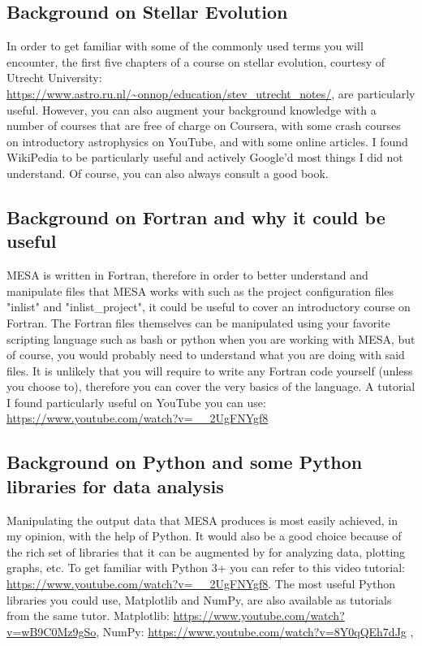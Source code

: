 \documentclass[12pt,hidelinks]{article}
\begin{document}
	\subsection{Background on Stellar Evolution}
			In order to get familiar with some of the commonly used terms you will encounter, the first five chapters of a course on stellar evolution, courtesy of Utrecht University: \url{https://www.astro.ru.nl/~onnop/education/stev_utrecht_notes/}, are particularly useful. However, you can also augment your background knowledge with a number of courses that are free of charge on Coursera, with some crash courses on introductory astrophysics on YouTube, and with some online articles. I found WikiPedia to be particularly useful and actively Google'd most things I did not understand. Of course, you can also always consult a good book.
	\subsection{Background on Fortran and why it could be useful}
			MESA is written in Fortran, therefore in order to better understand and manipulate files that MESA works with such as the project configuration files "inlist" and "inlist\_project", it could be useful to cover an introductory course on Fortran. The Fortran files themselves can be manipulated using your favorite scripting language such as bash or python when you are working with MESA, but of course, you would probably need to understand what you are doing with said files. It is unlikely that you will require to write any Fortran code yourself (unless you choose to), therefore you can cover the very basics of the language. A tutorial I found particularly useful on YouTube you can use: \url{https://www.youtube.com/watch?v=__2UgFNYgf8} 
	\subsection{Background on Python and some Python libraries for data analysis}
			Manipulating the output data that MESA produces is most easily achieved, in my opinion, with the help of Python. It would also be a good choice because of the rich set of libraries that it can be augmented by for analyzing data, plotting graphs, etc. To get familiar with Python 3+ you can refer to this video tutorial: \url{https://www.youtube.com/watch?v=__2UgFNYgf8}. The most useful Python libraries you could use, Matplotlib and NumPy, are also available as tutorials from the same tutor. Matplotlib: \url{https://www.youtube.com/watch?v=wB9C0Mz9gSo}, NumPy: \url{https://www.youtube.com/watch?v=8Y0qQEh7dJg}
, 	
	\vspace{-1.5mm}
\newpage
\end{document}
